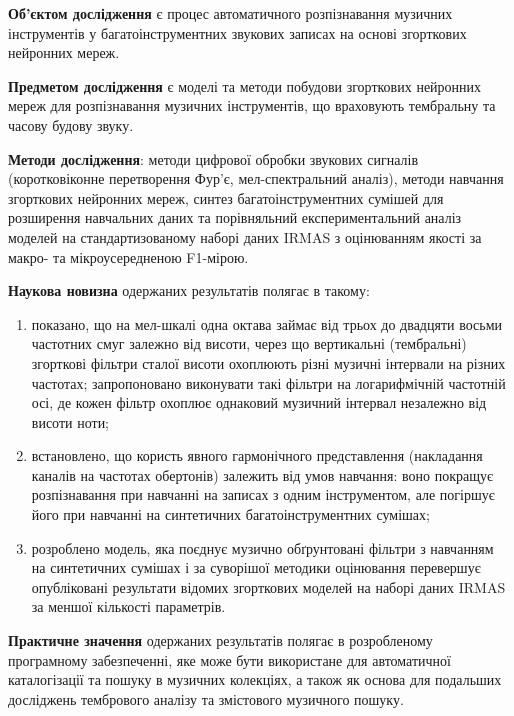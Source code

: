 \textbf{Об'єктом дослідження} є процес автоматичного розпізнавання
музичних інструментів у багатоінструментних звукових записах на основі
згорткових нейронних мереж.

\textbf{Предметом дослідження} є моделі та методи побудови згорткових
нейронних мереж для розпізнавання музичних інструментів, що враховують
тембральну та часову будову звуку.

\textbf{Методи дослідження}: методи цифрової обробки звукових сигналів
(коротковіконне перетворення Фур'є, мел-спектральний аналіз), методи
навчання згорткових нейронних мереж, синтез багатоінструментних сумішей для
розширення навчальних даних та порівняльний експериментальний аналіз
моделей на стандартизованому наборі даних IRMAS з оцінюванням якості за
макро- та мікроусередненою F1-мірою.

\textbf{Наукова новизна} одержаних результатів полягає в такому:
\begin{enumerate}
    \item показано, що на мел-шкалі одна октава займає від трьох до
    двадцяти восьми частотних смуг залежно від висоти, через що вертикальні
    (тембральні) згорткові фільтри сталої висоти охоплюють різні музичні
    інтервали на різних частотах; запропоновано виконувати такі фільтри на
    логарифмічній частотній осі, де кожен фільтр охоплює однаковий музичний
    інтервал незалежно від висоти ноти;
    \item встановлено, що користь явного гармонічного представлення
    (накладання каналів на частотах обертонів) залежить від умов навчання:
    воно покращує розпізнавання при навчанні на записах з одним
    інструментом, але погіршує його при навчанні на синтетичних
    багатоінструментних сумішах;
    \item розроблено модель, яка поєднує музично обґрунтовані фільтри з
    навчанням на синтетичних сумішах і за суворішої методики оцінювання
    перевершує опубліковані результати відомих згорткових моделей на наборі
    даних IRMAS за меншої кількості параметрів.
\end{enumerate}

\textbf{Практичне значення} одержаних результатів полягає в розробленому
програмному забезпеченні, яке може бути використане для автоматичної
каталогізації та пошуку в музичних колекціях, а також як основа для
подальших досліджень тембрового аналізу та змістового музичного пошуку.